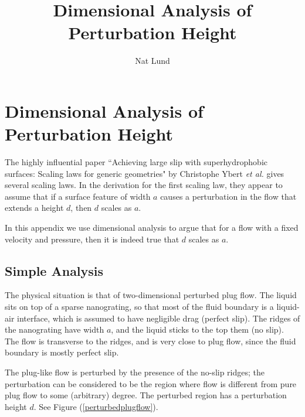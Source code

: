 \documentclass[12pt, a4paper, twoside, openright]{book}
\title{Dimensional Analysis of Perturbation Height}
\author{Nat Lund}
\begin{document}
\chapter{Dimensional Analysis of Perturbation Height}\label{C:dimension}

The highly influential paper ``Achieving large slip with superhydrophobic surfaces: Scaling laws for generic geometries" by Christophe Ybert \emph{et al.} \cite{Ybert2007} gives several scaling laws.  In the derivation for the first scaling law, they appear to assume that if a surface feature of width $a$ causes a perturbation in the flow that extends a height $d$, then $d$ scales as $a$.

In this appendix we use dimensional analysis to argue that for a flow with a fixed velocity and pressure, then it is indeed true that $d$ scales as $a$.

\section{Simple Analysis}

The physical situation is that of two-dimensional perturbed plug flow.  The liquid sits on top of a sparse nanograting, so that most of the fluid boundary is a liquid-air interface, which is assumed to have negligible drag (perfect slip).  The ridges of the nanograting have width $a$, and the liquid sticks to the top them (no slip).  The flow is transverse to the ridges, and is very close to plug flow, since the fluid boundary is mostly perfect slip.

The plug-like flow is perturbed by the presence of the no-slip ridges; the perturbation can be considered to be the region where flow is different from pure plug flow to some (arbitrary) degree.  The perturbed region has a perturbation height $d$. 
See Figure (\ref{perturbedplugflow}).
\end{document}
